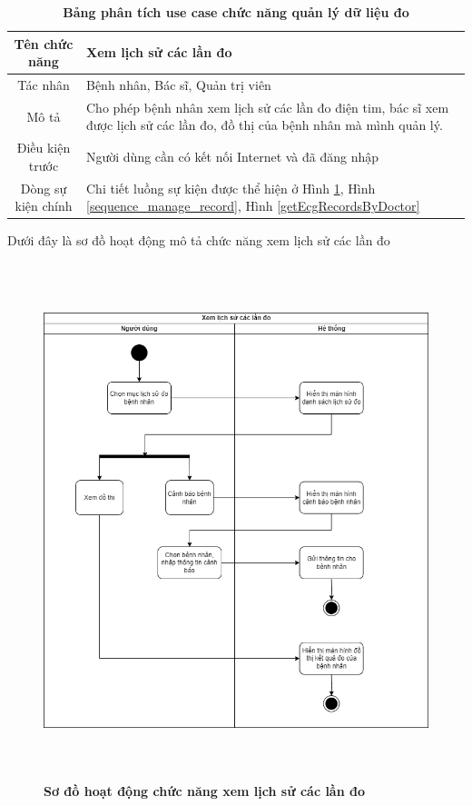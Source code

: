   \begin{table}[H]
    \caption{\bfseries \fontsize{12pt}{0pt}\selectfont Bảng phân tích use case chức năng quản lý dữ liệu đo}
    \centering
    \begin{tabularx}{0.9\textwidth}{|c|X|}
      \hline
      \textbf{Tên chức năng} & \textbf{Xem lịch sử các lần đo} \\
      \hline
      Tác nhân & Bệnh nhân, Bác sĩ, Quản trị viên \\
      \hline
      Mô tả & Cho phép bệnh nhân xem lịch sử các lần đo điện tim, bác sĩ xem được lịch sử các lần đo, đồ thị của bệnh nhân
      mà mình quản lý.\\
      \hline
      Điều kiện trước & Người dùng cần có kết nối Internet và đã đăng nhập \\
      \hline
      Dòng sự kiện chính & 
        Chi tiết luồng sự kiện được thể hiện ở Hình \ref{activity_record_history}, Hình \ref{sequence_manage_record}, Hình \ref{getEcgRecordsByDoctor} 
        \\
      \hline
    \end{tabularx}
  \end{table}
  Dưới đây là sơ đồ hoạt động mô tả chức năng xem lịch sử các lần đo
  \begin{figure}[H]
    \centering
    \includegraphics[width=13.5cm,height=15cm]{Images/activity/activity_record_history.png}
    \caption[Sơ đồ hoạt động chức năng xem lịch sử các lần đo]{\bfseries \fontsize{12pt}{0pt}
    \selectfont Sơ đồ hoạt động chức năng xem lịch sử các lần đo}
    \label{activity_record_history} %
  \end{figure}

